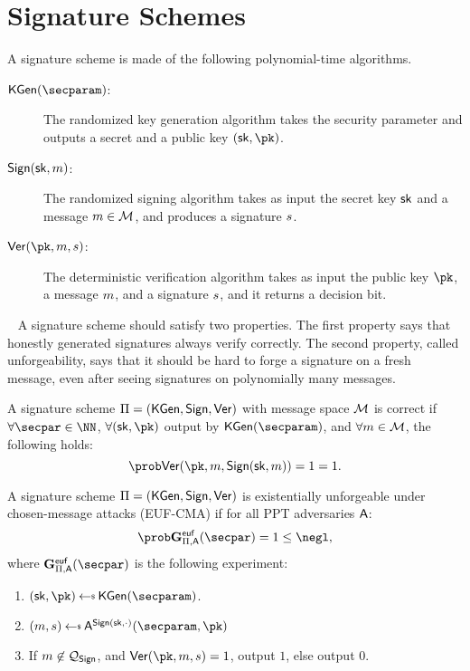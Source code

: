 \section{Signature Schemes}\label{sec:signatures}

A signature scheme is made of the following polynomial-time algorithms.

\begin{description}
    \item[$\kgen(\secparam)$:] The randomized key generation algorithm takes the security parameter  and  outputs a secret and a public key $(\sk, \pk)$.

    \item[$\mathsf{Sign}(\mathsf{sk}, m)$:] The randomized signing algorithm takes as input the secret key $\mathsf{sk}$ and a message $m\in\mathcal{M}$, and produces a signature $s$.

    \item[$\ver(\pk, \msg,\signature)$:] The deterministic verification algorithm takes as input the public key $\pk$, a message $m$, and a signature $s$, and it returns a decision bit.
\end{description}
~\newline
A signature scheme should satisfy two properties. The first property says that honestly generated signatures always verify correctly. The second property, called unforgeability, says that it should be hard to forge a signature on a fresh message, even after seeing signatures on polynomially many messages.

\begin{definition} \label{def:Sigcorrectness}
    A signature scheme $\Pi= (\mathsf{KGen}, \allowbreak \mathsf{Sign}, \mathsf{Ver})$ with message space $\mathcal{M}$ is correct if $\forall\secpar\in\NN$, $\forall (\sk, \pk)$ output by $\kgen(\allowbreak\secparam)$, and $\forall m \in \mathcal{M}$, the following holds:
    \[
        \Prob{\ver(\pk, \msg,\sign(\sk, \msg)) = 1} = 1.
    \]
\end{definition}

\begin{definition} \label{def:SigUnforgeability}
    A signature scheme $\Pi= (\allowbreak\mathsf{KGen}, \allowbreak \mathsf{Sign}, \mathsf{Ver})$ is existentially unforgeable under chosen-message attacks (EUF-CMA) if for all PPT adversaries $\mathsf{A}$:
    \[
        \Prob{\Sigeufgame_{\Pi,\adversary}(\secpar) = 1} \leq \negl,
    \]
    where $\Sigeufgame_{\Pi,\adversary}(\secpar)$ is the following experiment:
    \begin{enumerate}
        \item $(\sk, \pk) \getsr \kgen(\secparam)$.
        \item $(\msg, \signature) \getsr \adversary^{\sign(\sk, \cdot)}(\secparam, \pk)$
        \item If $m \not\in \mathcal{Q}_{\mathsf{Sign}}$, and $\ver(\pk,\msg, \signature) = 1$, output $1$, else output $0$.
    \end{enumerate}
\end{definition}